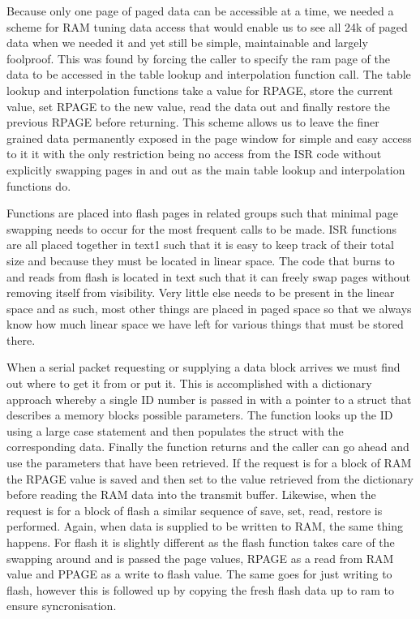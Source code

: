 \documentclass[12pt,a4wide,titlepage]{article}
\begin{document}
Because only one page of paged data can be accessible at a time, we needed a scheme for RAM tuning data access that would enable us to see all 24k of paged data when we needed it and yet still be simple, maintainable and largely foolproof. This was found by forcing the caller to specify the ram page of the data to be accessed in the table lookup and interpolation function call. The table lookup and interpolation functions take a value for RPAGE, store the current value, set RPAGE to the new value, read the data out and finally restore the previous RPAGE before returning. This scheme allows us to leave the finer grained data permanently exposed in the page window for simple and easy access to it it with the only restriction being no access from the ISR code without explicitly swapping pages in and out as the main table lookup and interpolation functions do.

Functions are placed into flash pages in related groups such that minimal page swapping needs to occur for the most frequent calls to be made. ISR functions are all placed together in text1 such that it is easy to keep track of their total size and because they must be located in linear space. The code that burns to and reads from flash is located in text such that it can freely swap pages without removing itself from visibility. Very little else needs to be present in the linear space and as such, most other things are placed in paged space so that we always know how much linear space we have left for various things that must be stored there.

When a serial packet requesting or supplying a data block arrives we must find out where to get it from or put it. This is accomplished with a dictionary approach whereby a single ID number is passed in with a pointer to a struct that describes a memory blocks possible parameters. The function looks up the ID using a large case statement and then populates the struct with the corresponding data. Finally the function returns and the caller can go ahead and use the parameters that have been retrieved. If the request is for a block of RAM the RPAGE value is saved and then set to the value retrieved from the dictionary before reading the RAM data into the transmit buffer. Likewise, when the request is for a block of flash a similar sequence of save, set, read, restore is performed. Again, when data is supplied to be written to RAM, the same thing happens. For flash it is slightly different as the flash function takes care of the swapping around and is passed the page values, RPAGE as a read from RAM value and PPAGE as a write to flash value. The same goes for just writing to flash, however this is followed up by copying the fresh flash data up to ram to ensure syncronisation.
\end{document}

